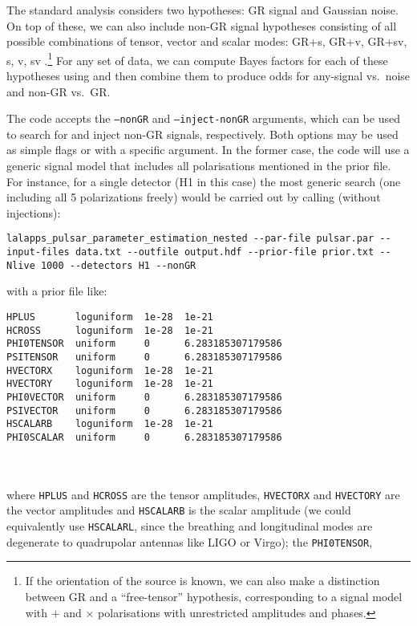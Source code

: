 The standard analysis considers two hypotheses: GR signal and Gaussian noise. On top of these, we can also include non-GR signal hypotheses consisting of all
possible combinations of tensor, vector and scalar modes: GR+s, GR+v, GR+sv, s, v, sv \citep[see][for definitions of these]{MaxCWpolariations}.\footnote{If the
orientation of the source is known, we can also make a distinction between GR and a ``free-tensor'' hypothesis, corresponding to a signal model with $+$ and $\times$
polarisations with unrestricted amplitudes and phases.} For any set of data, we can compute Bayes factors for each of these hypotheses using \lppen and then combine
them to produce odds for any-signal vs.\ noise and non-GR vs.\ GR.

The \lppen code accepts the {\tt --nonGR} and {\tt --inject-nonGR} arguments, which can be used to search for and inject non-GR signals, respectively. Both options may
be used as simple flags or with a specific argument. In the former case, the code will use a generic signal model that includes all polarisations mentioned in the prior
file. For instance, for a single detector (H1 in this case) the most generic search (one including all 5 polarizations freely) would be carried out by calling (without injections):
\begin{lstlisting}[frame=single]
lalapps_pulsar_parameter_estimation_nested --par-file pulsar.par --input-files data.txt --outfile output.hdf --prior-file prior.txt --Nlive 1000 --detectors H1 --nonGR
\end{lstlisting}
with a prior file like:
\begin{lrbox}{\Lst}
\begin{lstlisting}
HPLUS       loguniform  1e-28  1e-21
HCROSS      loguniform  1e-28  1e-21
PHI0TENSOR  uniform     0      6.283185307179586
PSITENSOR   uniform     0      6.283185307179586
HVECTORX    loguniform  1e-28  1e-21
HVECTORY    loguniform  1e-28  1e-21
PHI0VECTOR  uniform     0      6.283185307179586
PSIVECTOR   uniform     0      6.283185307179586
HSCALARB    loguniform  1e-28  1e-21
PHI0SCALAR  uniform     0      6.283185307179586
\end{lstlisting}
\end{lrbox}
\\[5pt] \indent \fbox{\usebox{\Lst}} \\[5pt]
where {\tt HPLUS} and {\tt HCROSS} are the tensor amplitudes, {\tt HVECTORX} and {\tt HVECTORY} are the vector amplitudes and {\tt HSCALARB} is the scalar amplitude
(we could equivalently use {\tt HSCALARL}, since the breathing and longitudinal modes are degenerate to quadrupolar antennas like LIGO or Virgo); the {\tt PHI0TENSOR},
